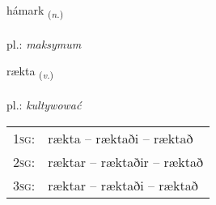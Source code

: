 \documentclass[frontgrid, backgrid]{flacards}\usepackage[]{graphicx}\usepackage[]{xcolor}
\begin{document}
\renewcommand{\flhead}{\vskip5pt \fboxsep=0pt {\small\bfseries\footnotesize Nafnorð | rzeczownik}}
\renewcommand{\fcfoot}{\vskip5pt \fboxsep=0pt \hspace{2pt}{\small\bfseries\footnotesize 3K}}

\renewcommand{\blhead}{\vskip5pt {\small\bfseries\footnotesize Nafnorð | rzeczownik }}
\renewcommand{\bcfoot}{\vskip5pt \hspace{2pt}{\small\bfseries\footnotesize 3K}}


{hámark \small{\textsubscript{(\textit{n.})}} \\[1ex] %
\textphonetic{[hauːmar̥k]} \\
pl.: \emph{maksymum} \\  [2ex]
\renewcommand*{\arraystretch}{0.8}
}

\renewcommand{\flhead}{\vskip5pt \fboxsep=0pt {\small\bfseries\footnotesize Sagnorð | czasownik}}
\renewcommand{\fcfoot}{\vskip5pt \fboxsep=0pt \hspace{2pt}{\small\bfseries\footnotesize 3K}}

\renewcommand{\blhead}{\vskip5pt {\small\bfseries\footnotesize Sagnorð | czasownik }}
\renewcommand{\bcfoot}{\vskip5pt \hspace{2pt}{\small\bfseries\footnotesize 3K}}


{rækta \small{\textsubscript{(\textit{v.})}} \\[1ex] %
\textphonetic{[raixta]} \\
pl.: \emph{kultywować} \\  [2ex]
\renewcommand*{\arraystretch}{0.8}
\begin{tabular}{p{1cm}l}
\textsc{1sg}: & rækta -- ræktaði -- ræktað \\ 
\textsc{2sg}: & ræktar -- ræktaðir -- ræktað \\ 
\textsc{3sg}: & ræktar -- ræktaði -- ræktað \\ 
\end{tabular}
}
\end{document}
